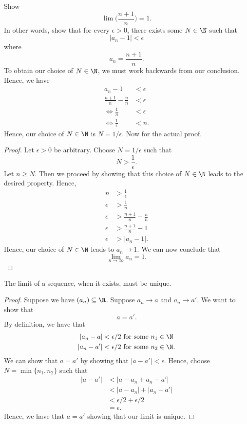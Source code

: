 \begin{ex}
Show 
\[ \lim \Big( \frac{n+1}{n}\Big) = 1.\]
In other words, show that for every \( \epsilon  > 0 \), there exists some \( N \in \N \) such that 
\[ |a_n - 1| < \epsilon \] where 
\[ a_n = \frac{n+1}{n}. \]
To obtain our choice of \( N \in \N \), we must work backwards from our conclusion. Hence, we have 
\begin{align*}
a_n - 1 &< \epsilon  \\
\frac{n+1}{n} - \frac{n}{n} &< \epsilon \\ 
\iff \frac{1}{n} &<  \epsilon \\
\iff \frac{1}{ \epsilon } &< n.
\end{align*}
Hence, our choice of \( N \in \N \) is \( N = 1/ \epsilon \). Now for the actual proof. 

\begin{proof}
Let \( \epsilon  > 0 \) be arbitrary. Choose \( N = 1 / \epsilon  \) such that 
\[ N > \frac{1}{ \epsilon }.\]
Let \( n \geq N \). Then we proceed by showing that this choice of \( N \in \N \) leads to the desired property. 
Hence, 
\begin{align*}
n &> \frac{1}{ \epsilon } \\
\epsilon &> \frac{1}{ n } \\
\epsilon  &> \frac{ n+1 }{n} - \frac{n}{n} \\ 
\epsilon &> \frac{n+1}{n} - 1 \\
\epsilon  &> |a_n - 1|.
\end{align*}
Hence, our choice of \( N \in \N \) leads to \( a_n \to 1 \). We can now conclude that 
\[ \lim_{n \to \infty} a_n = 1.\]
\end{proof}
\end{ex}

\begin{tcolorbox}
    \begin{thm}
The limit of a sequence, when it exists, must be unique.
\end{thm}
\end{tcolorbox}

\begin{proof}
Suppose we have \( (a_n) \subseteq \R \). Suppose \( a_n \to a \) and \( a_n \to a' \). We want to show that 
\[ a = a' .  \]
By definition, we have that 
\begin{align*}
    |a_n - a |&< \epsilon/2   \text{ for some } n_1 \in \N \\
    |a_n - a'| &< \epsilon/2 \text{ for some } n_2 \in \N .
\end{align*}
We can show that \( a = a' \) by showing that \( |a - a'| < \epsilon\). Hence, choose \( N = \min \{ n_1, n_2 \}\) such that 
\begin{align*}
 |a - a'|&< |a - a_n + a_n - a' |  \\
         &< |a - a_n | + |a_n - a'| \\
         &< \epsilon/2 + \epsilon/2 \\
         &= \epsilon.
\end{align*}
Hence, we have that \( a = a' \) showing that our limit is unique. 
\end{proof}



